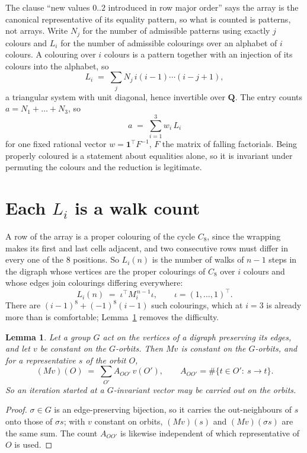 \documentclass[11pt,a4paper]{article}
\theoremstyle{plain}
\newtheorem{lemma}[theorem]{Lemma}
\theoremstyle{definition}
\begin{document}
The clause ``new values $0..2$ introduced in row major order'' says the array is the
canonical representative of its equality pattern, so what is counted is patterns, not arrays.
Write $N_j$ for the number of admissible patterns using exactly $j$ colours and $L_i$ for the
number of admissible colourings over an alphabet of $i$ colours. A colouring over $i$ colours
is a pattern together with an injection of its colours into the alphabet, so
\[
L_i\;=\;\sum_j N_j\,i(i-1)\cdots(i-j+1),
\]
a triangular system with unit diagonal, hence invertible over $\mathbf{Q}$. The entry counts
$a=N_1+\dots+N_{3}$, so
\[
a\;=\;\sum_{i=1}^{3}w_i\,L_i
\]
for one fixed rational vector $w=\mathbf{1}^{\!\top}F^{-1}$, $F$ the matrix of falling
factorials. Being properly coloured is a statement about equalities alone, so it is invariant
under permuting the colours and the reduction is legitimate.

\section{Each $L_i$ is a walk count}

A row of the array is a proper colouring of the cycle $C_{8}$, since the wrapping makes
its first and last cells adjacent, and two consecutive rows must differ in every one of the
$8$ positions. So $L_i(n)$ is the number of walks of $n-1$ steps in the digraph whose
vertices are the proper colourings of $C_{8}$ over $i$ colours and whose edges join
colourings differing everywhere:
\[
L_i(n)\;=\;\iota^{\!\top}M_i^{\,n-1}\iota ,\qquad \iota=(1,\dots,1)^{\!\top} .
\]
There are $(i-1)^{8}+(-1)^{8}(i-1)$ such colourings, which at $i=3$ is already more
than is comfortable; Lemma~\ref{lem:lump} removes the difficulty.

\begin{lemma}\label{lem:lump}
Let a group $G$ act on the vertices of a digraph preserving its edges, and let $v$ be constant
on the $G$-orbits. Then $Mv$ is constant on the $G$-orbits, and for a representative $s$ of
the orbit $O$,
\[
(Mv)(O)\;=\;\sum_{O'}A_{OO'}\,v(O'),\qquad
A_{OO'}=\#\{t\in O':\ s\to t\} .
\]
So an iteration started at a $G$-invariant vector may be carried out on the orbits.
\end{lemma}

\begin{proof}
$\sigma\in G$ is an edge-preserving bijection, so it carries the out-neighbours of $s$ onto
those of $\sigma s$; with $v$ constant on orbits, $(Mv)(s)$ and $(Mv)(\sigma s)$ are the same
sum. The count $A_{OO'}$ is likewise independent of which representative of $O$ is used.
\end{proof}
\end{document}
